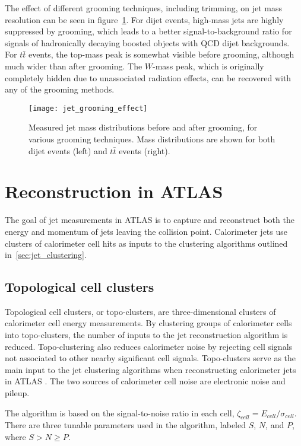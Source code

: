 The effect of different grooming techniques, including trimming, on jet mass resolution can be seen in figure~\ref{fig:jet_grooming_effect}.
For dijet events, high-mass jets are highly suppressed by grooming, which leads to a better signal-to-background ratio
for signals of hadronically decaying boosted objects with QCD dijet backgrounds.
For $t\bar{t}$ events, the top-mass peak is somewhat visible before grooming, although much wider than after grooming.
The $W$-mass peak, which is originally completely hidden due to unassociated radiation effects,
can be recovered with any of the grooming methods.

\begin{figure}[!ht]
    \centering
\texttt{[image: jet\_grooming\_effect]}
\caption{Measured jet mass distributions before and after grooming, for various grooming techniques.
Mass distributions are shown for both dijet events (left) and $t\bar{t}$ events (right).}
\label{fig:jet_grooming_effect}
\end{figure}

\section{Reconstruction in ATLAS}\label{sec:jet_reconstruction}
The goal of jet measurements in ATLAS is to capture and reconstruct both the energy and momentum of jets leaving the
collision point.
Calorimeter jets use clusters of calorimeter cell hits as inputs to the clustering algorithms outlined
in~\ref{sec:jet_clustering}.

\subsection{Topological cell clusters}\label{subsec:jet_topo_clusters}
Topological cell clusters, or topo-clusters, are three-dimensional clusters of calorimeter cell energy measurements.
By clustering groups of calorimeter cells into topo-clusters, the number of inputs to the jet reconstruction algorithm
is reduced.
Topo-clustering also reduces calorimeter noise by rejecting cell signals not associated to other nearby significant
cell signals.\cite{jet-topo-cluster}
Topo-clusters serve as the main input to the jet clustering algorithms when reconstructing calorimeter jets in ATLAS .
The two sources of calorimeter cell noise are electronic noise and pileup.

The algorithm is based on the signal-to-noise ratio in each cell, $\zeta_{cell} = E_{cell}/\sigma_{cell}$.
There are three tunable parameters used in the algorithm, labeled $S$, $N$, and $P$, where $S > N \geq P$.

